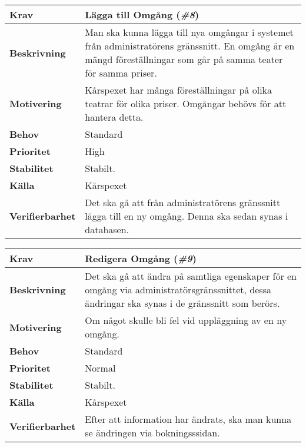 \documentclass[a4paper, twoside, 11pt, titlepage]{article}
\begin{document}
	\begin{tabular} { p{2.6cm} p{12.5cm} }
		\hline
		\sffamily\textbf{Krav} & Lägga till Omgång (\emph{\#8})  \\
		\hline
		\sffamily\textbf{Beskrivning} & Man ska kunna lägga till nya omgångar i systemet från administratörens gränssnitt. En omgång är en mängd föreställningar som går på samma teater för samma priser.  \\
		\hline
		\sffamily\textbf{Motivering} & Kårspexet har många föreställningar på olika teatrar för olika priser. Omgångar behövs för att hantera detta.  \\
		\hline
		\sffamily\textbf{Behov} & Standard  \\
		\hline
		\sffamily\textbf{Prioritet} & High  \\
		\hline
		\sffamily\textbf{Stabilitet} & Stabilt.  \\
		\hline
		\sffamily\textbf{Källa} & Kårspexet  \\
		\hline
		\sffamily\textbf{Verifierbarhet} & Det ska gå att från administratörens gränssnitt lägga till en ny omgång. Denna ska sedan synas i databasen.   \\
		\hline
	\end{tabular}
	\vspace{6mm}

	\begin{tabular} { p{2.6cm} p{12.5cm} }
		\hline
		\sffamily\textbf{Krav} & Redigera Omgång (\emph{\#9})  \\
		\hline
		\sffamily\textbf{Beskrivning} & Det ska gå att ändra på samtliga egenskaper för en omgång via administratörsgränssnittet, dessa ändringar ska synas i de gränssnitt som berörs.  \\
		\hline
		\sffamily\textbf{Motivering} & Om något skulle bli fel vid uppläggning av en ny omgång.  \\
		\hline
		\sffamily\textbf{Behov} & Standard  \\
		\hline
		\sffamily\textbf{Prioritet} & Normal  \\
		\hline
		\sffamily\textbf{Stabilitet} & Stabilt.  \\
		\hline
		\sffamily\textbf{Källa} & Kårspexet  \\
		\hline
		\sffamily\textbf{Verifierbarhet} & Efter att information har ändrats, ska man kunna se ändringen via bokningsssidan.  \\
		\hline
	\end{tabular}
	\vspace{6mm}
\end{document}
